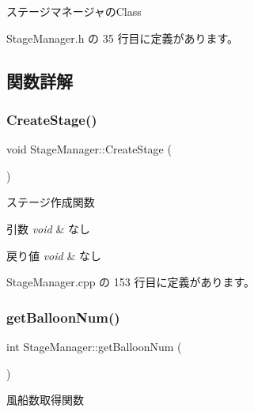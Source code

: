 ステージマネージャの\+Class 

 Stage\+Manager.\+h の 35 行目に定義があります。



\subsection{関数詳解}
\mbox{\label{class_stage_manager_a5fae84b1ae2f986bb79cb73d90595e77}} 
\subsubsection{\texorpdfstring{Create\+Stage()}{CreateStage()}}
{\footnotesize\ttfamily void Stage\+Manager\+::\+Create\+Stage (\begin{DoxyParamCaption}{ }\end{DoxyParamCaption})}



ステージ作成関数 


\begin{DoxyParams}{引数}
{\em void} & なし \\
\hline
\end{DoxyParams}

\begin{DoxyRetVals}{戻り値}
{\em void} & なし \\
\hline
\end{DoxyRetVals}


 Stage\+Manager.\+cpp の 153 行目に定義があります。

\mbox{\label{class_stage_manager_a5f83c5c1f67d47393b4d0be426a21ec0}} 
\subsubsection{\texorpdfstring{get\+Balloon\+Num()}{getBalloonNum()}}
{\footnotesize\ttfamily int Stage\+Manager\+::get\+Balloon\+Num (\begin{DoxyParamCaption}{ }\end{DoxyParamCaption})}



風船数取得関数 


